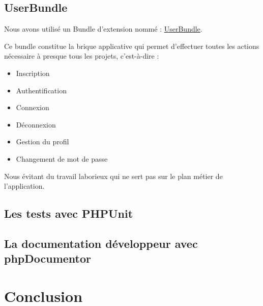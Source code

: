 \documentclass{report}
\begin{document}
    \subsection{UserBundle}
      Nous avons utilisé un Bundle d'extension nommé : 
      \href{https://github.com/FriendsOfSymfony/FOSUserBundle}{UserBundle}.
      
      Ce bundle constitue la brique applicative qui permet d'effectuer toutes
      les actions nécessaire à presque tous les projets, c'est-à-dire :
      \begin{itemize}
        \item{Inscription}
        \item{Authentification}
        \item{Connexion}
        \item{Déconnexion}
        \item{Gestion du profil}
        \item{Changement de mot de passe}
      \end{itemize}
      Nous évitant du travail laborieux qui ne sert pas sur le plan métier de
      l'application.

    \subsection{Les tests avec PHPUnit}
    \subsection{La documentation développeur avec phpDocumentor}

  \section*{Conclusion}
\end{document}
